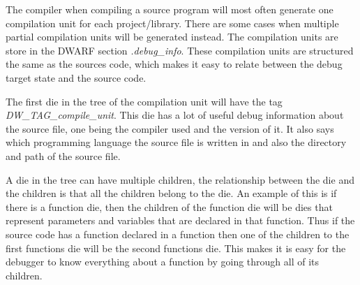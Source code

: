  


The compiler when compiling a source program will most often generate one compilation unit for each project/library.
There are some cases when multiple partial compilation units will be generated instead.
The compilation units are store in the \gls{DWARF} section \emph{.debug\_info}.
These compilation units are structured the same as the sources code, which makes it easy to relate between the debug target state and the source code.


The first \gls{die} in the tree of the compilation unit will have the tag \emph{DW\_TAG\_compile\_unit}.
This \gls{die} has a lot of useful debug information about the source file, one being the compiler used and the version of it.
It also says which programming language the source file is written in and also the directory and path of the source file.


A \gls{die} in the tree can have multiple children, the relationship between the \gls{die} and the children is that all the children belong to the \gls{die}.
An example of this is if there is a function \gls{die}, then the children of the function \gls{die} will be \glspl{die} that represent parameters and variables that are declared in that function.
Thus if the source code has a function declared in a function then one of the children to the first functions \gls{die} will be the second functions \gls{die}.
This makes it is easy for the debugger to know everything about a function by going through all of its children.


